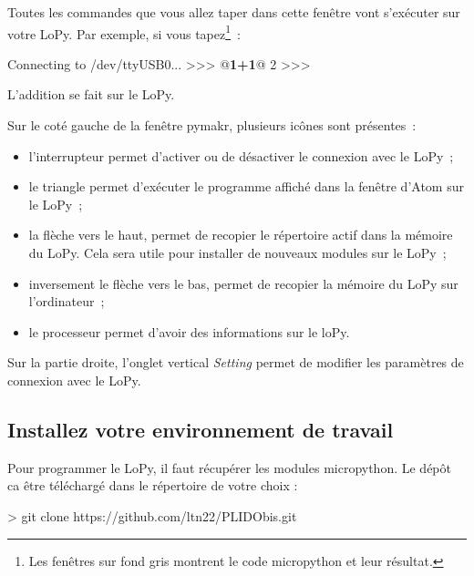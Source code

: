 Toutes les commandes que vous allez taper dans cette fenêtre vont s’exécuter sur votre LoPy. Par exemple, si vous tapez\footnote{Les fenêtres sur fond gris montrent le code micropython et leur résultat.}~:

\begin{termc}[backgroundcolor=\color{gray!10}, language=json, basicstyle=\ttfamily\small, escapechar=@]
Connecting to /dev/ttyUSB0...
>>> @\textbf{1+1}@
2
>>>
\end{termc}

L’addition se fait sur le LoPy.

     \vspace{1em}

Sur le coté gauche de la fenêtre pymakr, plusieurs icônes sont présentes~:
\begin{itemize}
    \item l'interrupteur permet d'activer ou de désactiver le connexion avec le LoPy~;
    \item le triangle permet d'exécuter le programme affiché dans la fenêtre d'Atom sur le LoPy~;
    \item la flèche vers le haut, permet de recopier le répertoire actif dans la mémoire du LoPy. Cela sera utile pour installer de nouveaux modules sur le LoPy~;
    \item inversement le flèche vers le bas, permet de recopier la mémoire du LoPy sur l'ordinateur~;
    \item le processeur permet d'avoir des informations sur le loPy.
\end{itemize}

     \vspace{1em}

Sur la partie droite, l'onglet vertical \textit{Setting} permet de modifier les paramètres de connexion avec le LoPy.

\subsection{Installez votre environnement de travail} 

Pour programmer le LoPy, il faut récupérer les modules micropython. Le dépôt ca être téléchargé dans le répertoire de votre choix :

\begin{termc}[backgroundcolor=\color{gray!10}, language=json, basicstyle=\ttfamily\small, escapechar=@]
> git clone https://github.com/ltn22/PLIDObis.git
\end{termc}

